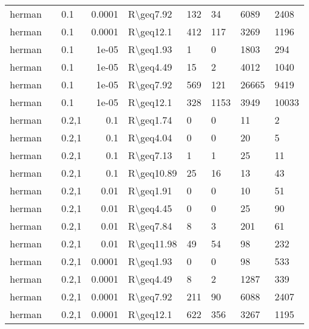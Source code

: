 \begin{longtable}{lllrlllll}
 herman        &           & 0.1   & 0.0001 & R\textbackslash{}geq7.92  & 132  & 34   & 6089     & 2408    \\
 herman        &           & 0.1   & 0.0001 & R\textbackslash{}geq12.1  & 412  & 117  & 3269     & 1196    \\
 herman        &           & 0.1   & 1e-05  & R\textbackslash{}geq1.93  & 1    & 0    & 1803     & 294     \\
 herman        &           & 0.1   & 1e-05  & R\textbackslash{}geq4.49  & 15   & 2    & 4012     & 1040    \\
 herman        &           & 0.1   & 1e-05  & R\textbackslash{}geq7.92  & 569  & 121  & 26665    & 9419    \\
 herman        &           & 0.1   & 1e-05  & R\textbackslash{}geq12.1  & 328  & 1153 & 3949     & 10033   \\
 herman        &           & 0.2,1 & 0.1    & R\textbackslash{}geq1.74  & 0    & 0    & 11       & 2       \\
 herman        &           & 0.2,1 & 0.1    & R\textbackslash{}geq4.04  & 0    & 0    & 20       & 5       \\
 herman        &           & 0.2,1 & 0.1    & R\textbackslash{}geq7.13  & 1    & 1    & 25       & 11      \\
 herman        &           & 0.2,1 & 0.1    & R\textbackslash{}geq10.89 & 25   & 16   & 13       & 43      \\
 herman        &           & 0.2,1 & 0.01   & R\textbackslash{}geq1.91  & 0    & 0    & 10       & 51      \\
 herman        &           & 0.2,1 & 0.01   & R\textbackslash{}geq4.45  & 0    & 0    & 25       & 90      \\
 herman        &           & 0.2,1 & 0.01   & R\textbackslash{}geq7.84  & 8    & 3    & 201      & 61      \\
 herman        &           & 0.2,1 & 0.01   & R\textbackslash{}geq11.98 & 49   & 54   & 98       & 232     \\
 herman        &           & 0.2,1 & 0.0001 & R\textbackslash{}geq1.93  & 0    & 0    & 98       & 533     \\
 herman        &           & 0.2,1 & 0.0001 & R\textbackslash{}geq4.49  & 8    & 2    & 1287     & 339     \\
 herman        &           & 0.2,1 & 0.0001 & R\textbackslash{}geq7.92  & 211  & 90   & 6088     & 2407    \\
 herman        &           & 0.2,1 & 0.0001 & R\textbackslash{}geq12.1  & 622  & 356  & 3267     & 1195    \\

\end{longtable}
